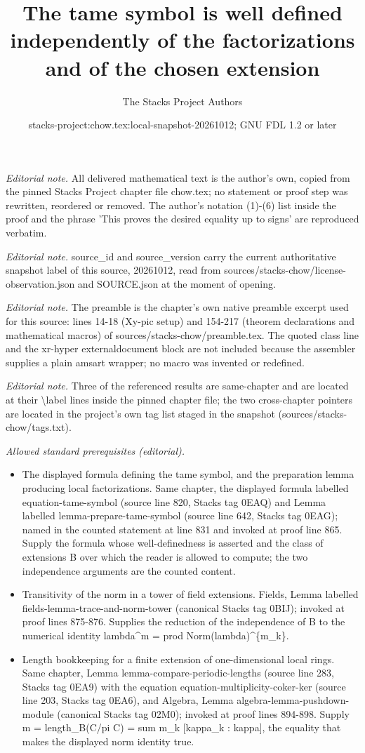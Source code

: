\documentclass[10pt,a4paper]{amsart}
\title{The tame symbol is well defined independently of the factorizations and of the chosen extension}
\author{The Stacks Project Authors}
\date{stacks-project:chow.tex:local-snapshot-20261012; GNU FDL 1.2 or later}
\theoremstyle{plain}
\theoremstyle{definition}
\theoremstyle{remark}
\numberwithin{equation}{subsection}
\begin{document}
\maketitle
\noindent\textit{Editorial note.} All delivered mathematical text is the author's own, copied from the pinned Stacks Project chapter file chow.tex; no statement or proof step was rewritten, reordered or removed. The author's notation (1)-(6) list inside the proof and the phrase 'This proves the desired equality up to signs' are reproduced verbatim.\par\medskip
\noindent\textit{Editorial note.} source\_id and source\_version carry the current authoritative snapshot label of this source, 20261012, read from sources/stacks-chow/license-observation.json and SOURCE.json at the moment of opening.\par\medskip
\noindent\textit{Editorial note.} The preamble is the chapter's own native preamble excerpt used for this source: lines 14-18 (Xy-pic setup) and 154-217 (theorem declarations and mathematical macros) of sources/stacks-chow/preamble.tex. The quoted class line and the xr-hyper externaldocument block are not included because the assembler supplies a plain amsart wrapper; no macro was invented or redefined.\par\medskip
\noindent\textit{Editorial note.} Three of the referenced results are same-chapter and are located at their \textbackslash{}label lines inside the pinned chapter file; the two cross-chapter pointers are located in the project's own tag list staged in the snapshot (sources/stacks-chow/tags.txt).\par\medskip
\noindent\textit{Allowed standard prerequisites (editorial).}\begin{itemize}
\item The displayed formula defining the tame symbol, and the preparation lemma producing local factorizations. Same chapter, the displayed formula labelled equation-tame-symbol (source line 820, Stacks tag 0EAQ) and Lemma labelled lemma-prepare-tame-symbol (source line 642, Stacks tag 0EAG); named in the counted statement at line 831 and invoked at proof line 865. Supply the formula whose well-definedness is asserted and the class of extensions B over which the reader is allowed to compute; the two independence arguments are the counted content.
\item Transitivity of the norm in a tower of field extensions. Fields, Lemma labelled fields-lemma-trace-and-norm-tower (canonical Stacks tag 0BIJ); invoked at proof lines 875-876. Supplies the reduction of the independence of B to the numerical identity lambda\textasciicircum{}m = prod Norm(lambda)\textasciicircum{}\{m\_k\}.
\item Length bookkeeping for a finite extension of one-dimensional local rings. Same chapter, Lemma lemma-compare-periodic-lengths (source line 283, Stacks tag 0EA9) with the equation equation-multiplicity-coker-ker (source line 203, Stacks tag 0EA6), and Algebra, Lemma algebra-lemma-pushdown-module (canonical Stacks tag 02M0); invoked at proof lines 894-898. Supply m = length\_B(C/pi C) = sum m\_k [kappa\_k : kappa], the equality that makes the displayed norm identity true.
\end{itemize}\medskip
\end{document}
